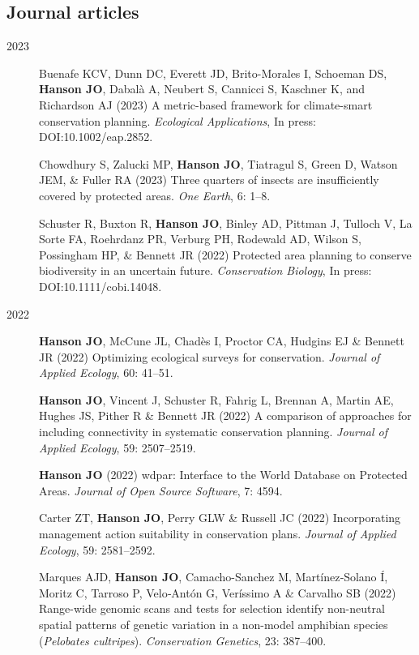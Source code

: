 \documentclass[12pt,a4paper]{article}
\begin{document}
\subsection*{Journal articles}
\begin{description}

\item[2023] Buenafe KCV, Dunn DC, Everett JD, Brito-Morales I, Schoeman DS, \textbf{Hanson JO}, Dabalà A, Neubert S, Cannicci S, Kaschner K, and Richardson AJ (2023) A metric-based framework for climate-smart conservation planning. \textit{Ecological Applications}, In press: DOI:10.1002/eap.2852.

\item[] Chowdhury S, Zalucki MP, \textbf{Hanson JO}, Tiatragul S, Green D, Watson JEM, \& Fuller RA (2023) Three quarters of insects are insufficiently covered by protected areas. \textit{One Earth}, 6: 1--8.

\item[] Schuster R, Buxton R, \textbf{Hanson JO}, Binley AD, Pittman J, Tulloch V, La Sorte FA, Roehrdanz PR, Verburg PH, Rodewald AD, Wilson S, Possingham HP, \& Bennett JR (2022) Protected area planning to conserve biodiversity in an uncertain future. \textit{Conservation Biology}, In press: DOI:10.1111/cobi.14048.

\item[2022] \textbf{Hanson JO}, McCune JL, Chadès I, Proctor CA, Hudgins EJ \& Bennett JR (2022) Optimizing ecological surveys for conservation. \textit{Journal of Applied Ecology}, 60: 41--51.

\item[] \textbf{Hanson JO}, Vincent J, Schuster R, Fahrig L, Brennan A, Martin AE, Hughes JS, Pither R \& Bennett JR (2022) A comparison of approaches for including connectivity in systematic conservation planning. \textit{Journal of Applied Ecology}, 59: 2507--2519.

\item [] \textbf{Hanson JO} (2022) wdpar: Interface to the World Database on Protected Areas. \textit{Journal of Open Source Software}, 7: 4594.

\item [] Carter ZT, \textbf{Hanson JO}, Perry GLW \& Russell JC (2022) Incorporating management action suitability in conservation plans. \textit{Journal of Applied Ecology}, 59: 2581--2592.

\item[] Marques AJD, \textbf{Hanson JO}, Camacho-Sanchez M, Martínez‐Solano Í, Moritz C, Tarroso P, Velo‐Antón G, Veríssimo A \& Carvalho SB (2022) Range-wide genomic scans and tests for selection identify non-neutral spatial patterns of genetic variation in a non-model amphibian species (\textit{Pelobates cultripes}). \textit{Conservation Genetics}, 23: 387--400.


\end{description}
\end{document}
